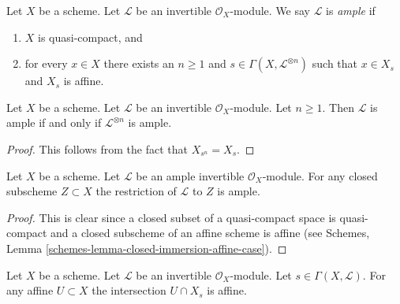 \begin{definition}
\label{definition-ample}
Let $X$ be a scheme.
Let $\mathcal{L}$ be an invertible $\mathcal{O}_X$-module.
We say $\mathcal{L}$ is {\it ample} if
\begin{enumerate}
\item $X$ is quasi-compact, and
\item for every $x \in X$ there exists an $n \geq 1$
and $s \in \Gamma(X, \mathcal{L}^{\otimes n})$ such
that $x \in X_s$ and $X_s$ is affine.
\end{enumerate}
\end{definition}

\begin{lemma}
\label{lemma-ample-power-ample}
Let $X$ be a scheme. Let $\mathcal{L}$ be an invertible $\mathcal{O}_X$-module.
Let $n \geq 1$. Then $\mathcal{L}$ is ample if and only if
$\mathcal{L}^{\otimes n}$ is ample.
\end{lemma}

\begin{proof}
This follows from the fact that $X_{s^n} = X_s$.
\end{proof}

\begin{lemma}
\label{lemma-ample-on-closed}
Let $X$ be a scheme.
Let $\mathcal{L}$ be an ample invertible $\mathcal{O}_X$-module.
For any closed subscheme $Z \subset X$ the restriction of
$\mathcal{L}$ to $Z$ is ample.
\end{lemma}

\begin{proof}
This is clear since a closed subset of a quasi-compact space is quasi-compact
and a closed subscheme of an affine scheme is affine (see
Schemes, Lemma \ref{schemes-lemma-closed-immersion-affine-case}).
\end{proof}

\begin{lemma}
\label{lemma-affine-cap-s-open}
Let $X$ be a scheme. Let $\mathcal{L}$ be an invertible $\mathcal{O}_X$-module.
Let $s \in \Gamma(X, \mathcal{L})$. For any affine $U \subset X$
the intersection $U \cap X_s$ is affine.
\end{lemma}

